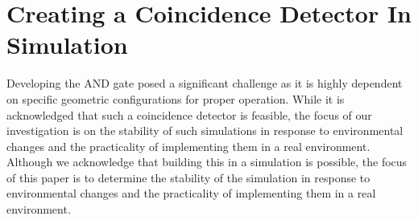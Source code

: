 \chapter{Creating a Coincidence Detector In Simulation} \label{chap:creating-detector}
Developing the AND gate posed a significant challenge as it is highly dependent on specific geometric configurations for proper operation. 
While it is acknowledged that such a coincidence detector is feasible, the focus of our investigation is on the stability of such simulations in response to environmental changes and the practicality of implementing them in a real environment.
Although we acknowledge that building this in a simulation is possible, the focus of this paper is to determine the stability of the simulation in response to environmental changes and the practicality of implementing them in a real environment. 


